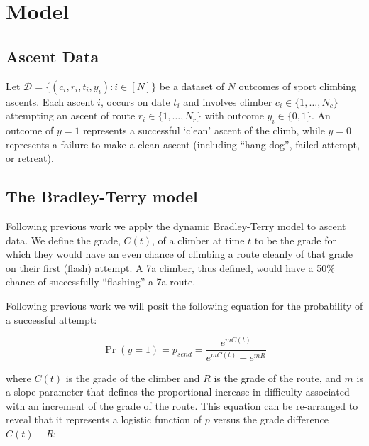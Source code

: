 \documentclass{article}
\begin{document}
\section*{Model}

\subsection*{Ascent Data}

Let $\mathcal{D} = \{(c_i, r_i, t_i, y_i) : i \in [N]\}$ be a dataset of $N$ outcomes of sport climbing ascents.  Each ascent $i$, occurs on date $t_i$ and involves climber $c_i \in \{1,\dots, N_c\}$ attempting an ascent of route $r_i \in \{1,\dots, N_r\}$ with outcome $y_i \in \{0,1\}$. An outcome of $y=1$ represents a successful `clean' ascent of the climb, while $y=0$ represents a failure to make a clean ascent (including ``hang dog'', failed attempt, or retreat). 

\subsection*{The Bradley-Terry model}

Following previous work  \cite{scarff2020estimation} we apply the dynamic Bradley-Terry model \cite{zermelo1929berechnung,bradley1952rank} to ascent data. We define the grade, $C(t)$, of a climber at time $t$ to be the grade for which they would have an even chance of climbing a route cleanly of that grade on their first (\gls{flash}) attempt. A 7a climber, thus defined, would have a 50\% chance of successfully ``flashing'' a 7a route. 

Following previous work \cite{scarff2020estimation} we will posit the following equation for the probability of a successful attempt:

\begin{equation}
\Pr(y = 1) = p_{send} = \frac{e^{mC(t)}}{e^{mC(t)} + e^{mR}}
\end{equation}

where $C(t)$ is the grade of the climber and $R$ is the grade of the route, and $m$ is a slope parameter that defines the proportional increase in difficulty associated with an increment of the grade of the route. This equation can be re-arranged to reveal that it represents a logistic function of $p$ versus the grade difference $C(t)-R$:
\end{document}
